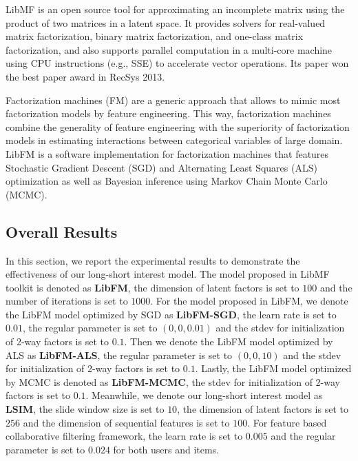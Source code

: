 \documentclass{llncs}
\begin{document}
LibMF is an open source tool for approximating an incomplete matrix
using the product of two matrices in a latent space.
It provides solvers for real-valued matrix factorization,
binary matrix factorization, and one-class matrix factorization, and 
also supports parallel computation in a multi-core machine using CPU
instructions (e.g., SSE) to accelerate vector operations.
Its paper \cite{chin2015fast} won the best paper award in RecSys 2013.

Factorization machines (FM) are a generic approach that
allows to mimic most factorization models by feature engineering.
This way, factorization machines combine the generality of
feature engineering with the superiority of factorization models
in estimating interactions between categorical variables of large domain.
LibFM \cite{rendle2012factorization} is a software implementation
for factorization machines that features
Stochastic Gradient Descent (SGD) and
Alternating Least Squares (ALS) optimization as well as
Bayesian inference using Markov Chain Monte Carlo (MCMC).

\subsection{Overall Results}
In this section, we report the experimental results to demonstrate
the effectiveness of our long-short interest model.
The model proposed in LibMF toolkit is denoted as \textbf{LibFM},
the dimension of latent factors is set to $100$ and the number of
iterations is set to $1000$.
For the model proposed in LibFM, we denote the LibFM model optimized by
SGD as \textbf{LibFM-SGD}, the learn rate is set to $0.01$, the regular
parameter is set to $(0,0,0.01)$ and the stdev for initialization of 2-way
factors is set to $0.1$. Then we denote the LibFM model optimized by ALS
as \textbf{LibFM-ALS}, the regular parameter is set to $(0,0,10)$ and the
stdev for initialization of 2-way factors is set to $0.1$. Lastly, the
LibFM model optimized by MCMC is denoted as \textbf{LibFM-MCMC}, the stdev
for initialization of 2-way factors is set to $0.1$.
Meanwhile, we denote our long-short interest model as \textbf{LSIM},
the slide window size is set to $10$, the dimension of latent factors is
set to $256$ and the dimension of sequential features is set to $100$.
For feature based collaborative filtering framework, the learn rate is set
to $0.005$ and the regular parameter is set to $0.024$ for both users and items.
\end{document}
